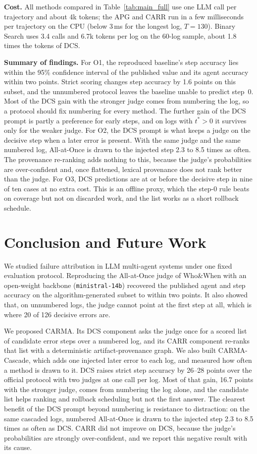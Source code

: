 \documentclass[conference]{IEEEtran}
\begin{document}
\textbf{Cost.} All methods compared in Table~\ref{tab:main_full} use one LLM call per trajectory and about 4k tokens; the APG and CARR run in a few milliseconds per trajectory on the CPU (below 3\,ms for the longest log, $T=130$). Binary Search uses 3.4 calls and 6.7k tokens per log on the 60-log sample, about 1.8 times the tokens of DCS.

\textbf{Summary of findings.} For O1, the reproduced baseline's step accuracy lies within the 95\% confidence interval of the published value and its agent accuracy within two points. Strict scoring changes step accuracy by 1.6 points on this subset, and the unnumbered protocol leaves the baseline unable to predict step~0. Most of the DCS gain with the stronger judge comes from numbering the log, so a protocol should fix numbering for every method. The further gain of the DCS prompt is partly a preference for early steps, and on logs with $t^*>0$ it survives only for the weaker judge. For O2, the DCS prompt is what keeps a judge on the decisive step when a later error is present. With the same judge and the same numbered log, All-at-Once is drawn to the injected step 2.3 to 8.5 times as often. The provenance re-ranking adds nothing to this, because the judge's probabilities are over-confident and, once flattened, lexical provenance does not rank better than the judge. For O3, DCS predictions are at or before the decisive step in nine of ten cases at no extra cost. This is an offline proxy, which the step-0 rule beats on coverage but not on discarded work, and the list works as a short rollback schedule.

\section{Conclusion and Future Work}\label{sec:concl}
We studied failure attribution in LLM multi-agent systems under one fixed evaluation protocol. Reproducing the All-at-Once judge of Who\&When with an open-weight backbone (\texttt{ministral-14b}) recovered the published agent and step accuracy on the algorithm-generated subset to within two points. It also showed that, on unnumbered logs, the judge cannot point at the first step at all, which is where 20 of 126 decisive errors are.

We proposed CARMA. Its DCS component asks the judge once for a scored list of candidate error steps over a numbered log, and its CARR component re-ranks that list with a deterministic artifact-provenance graph. We also built CARMA-Cascade, which adds one injected later error to each log, and measured how often a method is drawn to it. DCS raises strict step accuracy by 26--28 points over the official protocol with two judges at one call per log. Most of that gain, 16.7 points with the stronger judge, comes from numbering the log alone, and the candidate list helps ranking and rollback scheduling but not the first answer. The clearest benefit of the DCS prompt beyond numbering is resistance to distraction: on the same cascaded logs, numbered All-at-Once is drawn to the injected step 2.3 to 8.5 times as often as DCS. CARR did not improve on DCS, because the judge's probabilities are strongly over-confident, and we report this negative result with its cause.
\end{document}
